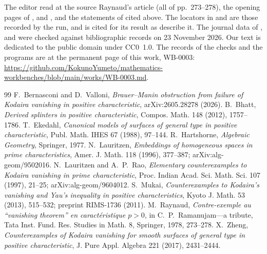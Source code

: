 \documentclass[11pt,a4paper]{article}
\theoremstyle{plain}
\theoremstyle{remark}
\newcommand{\workbenchurl}{https://github.com/KokunoYumeto/mathematics-workbenches/blob/main/works/WB-0003.md}
\begin{document}
The editor read at the source Raynaud's article \cite{Raynaud} (all of pp.~273--278), the opening pages of
\cite{LauritzenRao}, \cite{Mukai} and \cite{Ekedahl}, and the statements of \cite{BV} cited above. The locators in \cite{Bhatt} and \cite{Zheng} are those recorded by the run, and \cite{Lauritzen} is cited for its
result as \cite{LauritzenRao} describe it. The journal data of \cite{Lauritzen}, \cite{LauritzenRao} and \cite{Mukai} were
checked against bibliographic records on 23 November 2026. Our text is dedicated to the public domain under CC0~1.0. The records of the checks and the programs are at the
permanent page of this work, WB-0003: \url{\workbenchurl}.

\begin{thebibliography}{99}\small
{} F.~Bernasconi and D.~Valloni, \emph{Brauer--Manin obstruction from failure of Kodaira vanishing in positive
characteristic}, arXiv:2605.28278 (2026).
 B.~Bhatt, \emph{Derived splinters in positive characteristic}, Compos. Math. 148 (2012), 1757--1786.
 T.~Ekedahl, \emph{Canonical models of surfaces of general type in positive characteristic}, Publ. Math.
IHES 67 (1988), 97--144.
 R.~Hartshorne, \emph{Algebraic Geometry}, Springer, 1977.
 N.~Lauritzen, \emph{Embeddings of homogeneous spaces in prime characteristics}, Amer. J. Math. 118
(1996), 377--387; arXiv:alg-geom/9502016.
 N.~Lauritzen and A.~P.~Rao, \emph{Elementary counterexamples to Kodaira vanishing in prime
characteristic}, Proc. Indian Acad. Sci. Math. Sci. 107 (1997), 21--25; arXiv:alg-geom/9604012.
 S.~Mukai, \emph{Counterexamples to Kodaira's vanishing and Yau's inequality in positive
characteristics}, Kyoto J. Math. 53 (2013), 515--532; preprint RIMS-1736 (2011).
 M.~Raynaud, \emph{Contre-exemple au ``vanishing theorem'' en caract\'eristique $p>0$}, in
C.~P.~Ramanujam---a tribute, Tata Inst. Fund. Res. Studies in Math. 8, Springer, 1978, 273--278.
 X.~Zheng, \emph{Counterexamples of Kodaira vanishing for smooth surfaces of general type in positive
characteristic}, J. Pure Appl. Algebra 221 (2017), 2431--2444.
\end{thebibliography}
\end{document}
